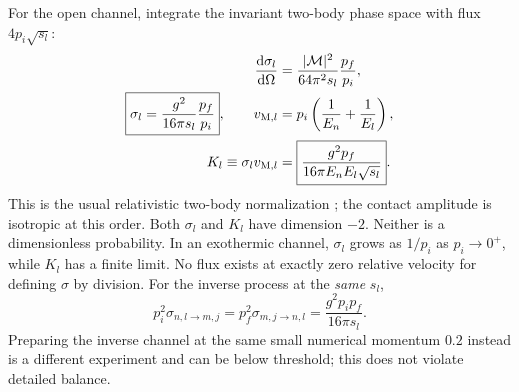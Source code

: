 \documentclass[11pt,a4paper]{article}
\newcommand{\dd}{\mathrm d}
\newcommand{\cM}{\mathcal M}
\begin{document}
For the open channel, integrate the invariant two-body phase space
with flux $4p_i\sqrt{s_l}$:
\begin{align}
 \frac{\dd\sigma_l}{\dd\Omega}
 &=\frac{|\cM|^2}{64\pi^2s_l}\frac{p_f}{p_i},\\
 \boxed{\sigma_l=\frac{g^2}{16\pi s_l}\frac{p_f}{p_i}},\qquad
 v_{{\rm M},l}&=p_i\left(\frac1{E_n}+\frac1{E_l}\right),\\
 K_l\equiv\sigma_l v_{{\rm M},l}
 &=\boxed{\frac{g^2p_f}{16\pi E_n E_l\sqrt{s_l}}}.
 \label{eq:rate}
\end{align}
This is the usual relativistic two-body normalization
\cite{pdg,tong}; the contact amplitude is isotropic at this order.
Both $\sigma_l$ and $K_l$ have dimension $-2$. Neither is a
dimensionless probability.
In an exothermic channel, $\sigma_l$ grows as $1/p_i$ as
$p_i\to0^+$, while $K_l$ has a finite limit. No flux exists at
exactly zero relative velocity for defining $\sigma$ by division.
For the inverse process at the \emph{same} $s_l$,
\begin{equation}
 p_i^2\sigma_{n,l\to m,j}
 =p_f^2\sigma_{m,j\to n,l}
 =\frac{g^2p_i p_f}{16\pi s_l}.
\end{equation}
Preparing the inverse channel at the same small numerical
momentum $0.2$ instead is a different experiment and can be below
threshold; this does not violate detailed balance.
\end{document}
